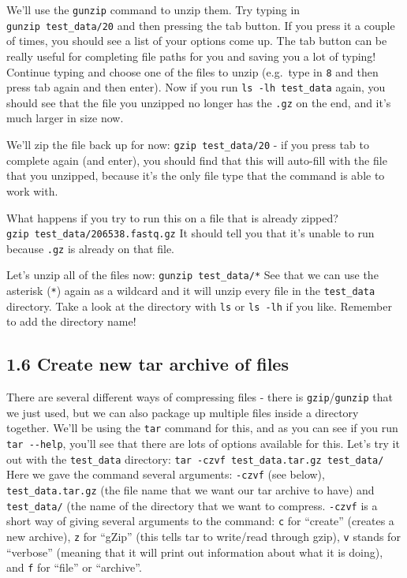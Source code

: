 \documentclass[
]{book}
\begin{document}
We'll use the \texttt{gunzip} command to unzip them. Try typing in \texttt{gunzip\ test\_data/20} and then pressing the tab button. If you press it a couple of times, you should see a list of your options come up. The tab button can be really useful for completing file paths for you and saving you a lot of typing! Continue typing and choose one of the files to unzip (e.g.~type in \texttt{8} and then press tab again and then enter).
Now if you run \texttt{ls\ -lh\ test\_data} again, you should see that the file you unzipped no longer has the \texttt{.gz} on the end, and it's much larger in size now.

We'll zip the file back up for now: \texttt{gzip\ test\_data/20} - if you press tab to complete again (and enter), you should find that this will auto-fill with the file that you unzipped, because it's the only file type that the command is able to work with.

What happens if you try to run this on a file that is already zipped? \texttt{gzip\ test\_data/206538.fastq.gz} It should tell you that it's unable to run because \texttt{.gz} is already on that file.

Let's unzip all of the files now: \texttt{gunzip\ test\_data/*}
See that we can use the asterisk (\texttt{*}) again as a wildcard and it will unzip every file in the \texttt{test\_data} directory. Take a look at the directory with \texttt{ls} or \texttt{ls\ -lh} if you like. Remember to add the directory name!

\subsection{1.6 Create new tar archive of files}\label{create-new-tar-archive-of-files}

There are several different ways of compressing files - there is \texttt{gzip}/\texttt{gunzip} that we just used, but we can also package up multiple files inside a directory together. We'll be using the \texttt{tar} command for this, and as you can see if you run \texttt{tar\ -\/-help}, you'll see that there are lots of options available for this. Let's try it out with the \texttt{test\_data} directory:
\texttt{tar\ -czvf\ test\_data.tar.gz\ test\_data/}
Here we gave the command several arguments: \texttt{-czvf} (see below), \texttt{test\_data.tar.gz} (the file name that we want our tar archive to have) and \texttt{test\_data/} (the name of the directory that we want to compress.
\texttt{-czvf} is a short way of giving several arguments to the command: \texttt{c} for ``create'' (creates a new archive), \texttt{z} for ``gZip'' (this tells tar to write/read through gzip), \texttt{v} stands for ``verbose'' (meaning that it will print out information about what it is doing), and \texttt{f} for ``file'' or ``archive''.
\end{document}
